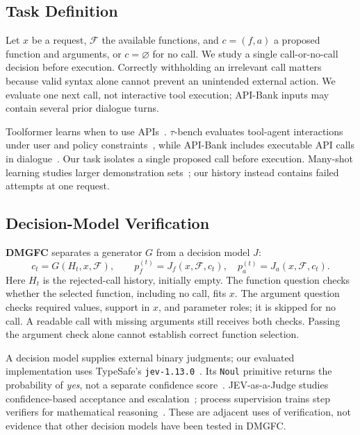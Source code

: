 \subsection{Task Definition}
Let $x$ be a request, $\mathcal{F}$ the available functions, and $c=(f,a)$ a proposed function and arguments, or $c=\varnothing$ for no call. We study a single call-or-no-call decision before execution. Correctly withholding an irrelevant call matters because valid syntax alone cannot prevent an unintended external action. We evaluate one next call, not interactive tool execution; API-Bank inputs may contain several prior dialogue turns.

Toolformer learns when to use APIs~\cite{schick2023toolformer}. $\tau$-bench evaluates tool-agent interactions under user and policy constraints~\cite{yao2024taubench}, while API-Bank includes executable API calls in dialogue~\cite{li2023apibank}. Our task isolates a single proposed call before execution. Many-shot learning studies larger demonstration sets~\cite{agarwal2024manyshot}; our history instead contains failed attempts at one request.

\subsection{Decision-Model Verification}
\textbf{DMGFC} separates a generator $G$ from a decision model $J$:
\begin{equation}
c_t=G(H_t,x,\mathcal{F}),\qquad
p_f^{(t)}=J_f(x,\mathcal{F},c_t),\quad
p_a^{(t)}=J_a(x,\mathcal{F},c_t).
\end{equation}
Here $H_t$ is the rejected-call history, initially empty. The function question checks whether the selected function, including no call, fits $x$. The argument question checks required values, support in $x$, and parameter roles; it is skipped for no call. A readable call with missing arguments still receives both checks. Passing the argument check alone cannot establish correct function selection.

A decision model supplies external binary judgments; our evaluated implementation uses TypeSafe's \texttt{jev-1.13.0}~\cite{typesafe2026models}. Its \texttt{Noul} primitive returns the probability of \emph{yes}, not a separate confidence score~\cite{typesafe2026noul,typesafe2026confidence}. JEV-as-a-Judge studies confidence-based acceptance and escalation~\cite{li2026jevjudge}; process supervision trains step verifiers for mathematical reasoning~\cite{lightman2023verify}. These are adjacent uses of verification, not evidence that other decision models have been tested in DMGFC.

